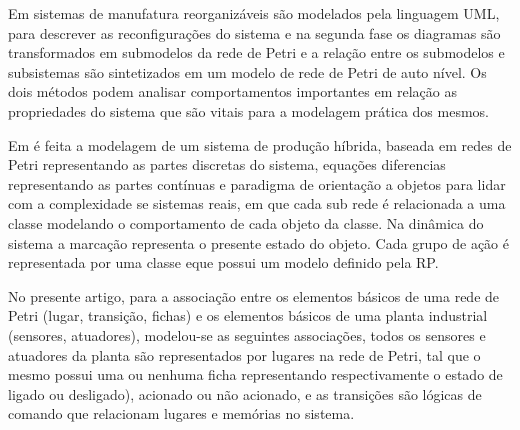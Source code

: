 Em 
sistemas de manufatura reorganizáveis são modelados pela linguagem UML, para descrever as reconfigurações do sistema e na segunda fase  os diagramas são transformados em submodelos da rede de Petri e a relação entre os submodelos e subsistemas são sintetizados em um modelo de rede de Petri de auto nível. Os dois métodos podem analisar comportamentos importantes em relação as propriedades do sistema que são vitais para a modelagem prática dos mesmos.

Em 
é feita a modelagem de um sistema de produção híbrida, baseada em redes de Petri representando as partes discretas do sistema, equações diferencias representando as partes contínuas e paradigma de orientação a objetos para lidar com a complexidade se sistemas reais, em que cada sub rede é relacionada a uma classe modelando o comportamento de cada objeto da classe. Na dinâmica do sistema a marcação representa o presente estado do objeto. Cada grupo de ação é representada por uma classe eque possui um modelo definido pela RP. 

No presente artigo, para a associação entre os elementos básicos de uma rede de Petri (lugar, transição, fichas) e os elementos básicos de uma planta industrial (sensores, atuadores), modelou-se as seguintes associações, todos os sensores e atuadores da planta são representados por lugares na rede de Petri, tal que o mesmo possui uma ou nenhuma ficha representando respectivamente o estado de ligado ou desligado), acionado ou não acionado, e as transições são lógicas de comando que relacionam lugares e memórias no sistema. 





\begin{comment}   

\section{Objetivos}
\subsection{Objetivos gerais}


\subsection{Objetivos específicos}
\begin{itemize}
    \item Modelagem ... ;
    \item Abordagem ...;
    \item Implementação ....; 
\end{itemize}

\end{comment}

